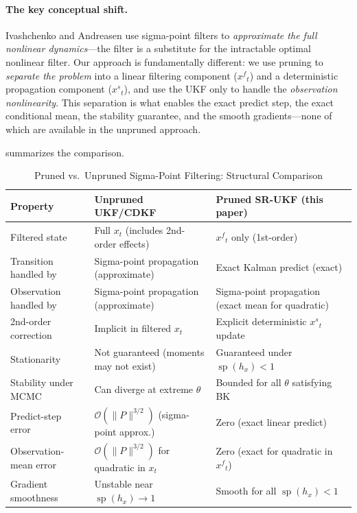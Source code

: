 \documentclass[12pt,a4paper]{article}
\newcommand{\xf}{{x^{f}}}
\newcommand{\xs}{{x^{s}}}
\newcommand{\hx}{h_x}
\newcommand{\cO}{\mathcal{O}}
\DeclareMathOperator{\specrad}{sp}
\begin{document}
\paragraph{The key conceptual shift.}
Ivashchenko and Andreasen use sigma-point filters to \emph{approximate
the full nonlinear dynamics}---the filter is a substitute for the
intractable optimal nonlinear filter. Our approach is fundamentally
different: we use pruning to \emph{separate the problem} into a
linear filtering component ($\xf_t$) and a deterministic propagation
component ($\xs_t$), and use the UKF only to handle the
\emph{observation nonlinearity}. This separation is what enables
the exact predict step, the exact conditional mean, the stability
guarantee, and the smooth gradients---none of which are available
in the unpruned approach.

 summarizes the comparison.

\begin{table}[htbp]
\centering
\caption{Pruned vs.\ Unpruned Sigma-Point Filtering: Structural Comparison}
\label{tab:pruning-comparison}
\small
\begin{tabular}{@{}p{3.8cm}p{5.2cm}p{5.2cm}@{}}
\toprule
Property
  & Unpruned UKF/CDKF
  & Pruned SR-UKF (this paper) \\
\midrule
Filtered state
  & Full $x_t$ (includes 2nd-order effects)
  & $\xf_t$ only (1st-order) \\
Transition handled by
  & Sigma-point propagation (approximate)
  & Exact Kalman predict (exact) \\
Observation handled by
  & Sigma-point propagation (approximate)
  & Sigma-point propagation (exact mean for quadratic) \\
2nd-order correction
  & Implicit in filtered $x_t$
  & Explicit deterministic $\xs_t$ update \\
Stationarity
  & Not guaranteed (moments may not exist)
  & Guaranteed under $\specrad(\hx) < 1$ \\
Stability under MCMC
  & Can diverge at extreme $\theta$
  & Bounded for all $\theta$ satisfying BK \\
Predict-step error
  & $\cO(\|P\|^{3/2})$ (sigma-point approx.)
  & Zero (exact linear predict) \\
Observation-mean error
  & $\cO(\|P\|^{3/2})$ for quadratic in $x_t$
  & Zero (exact for quadratic in $\xf_t$) \\
Gradient smoothness
  & Unstable near $\specrad(\hx) \to 1$
  & Smooth for all $\specrad(\hx) < 1$ \\
\bottomrule
\end{tabular}
\end{table}
\end{document}
